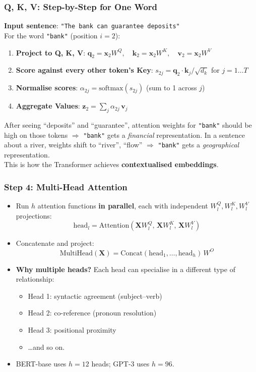 \begin{frame}[fragile]\frametitle{Q, K, V: Step-by-Step for One Word}
\textbf{Input sentence}: \texttt{"The bank can guarantee deposits"}\\[0.4em]
For the word \texttt{"bank"} (position $i = 2$):
\begin{enumerate}
\item \textbf{Project to Q, K, V}:
      $\mathbf{q}_2 = \mathbf{x}_2 W^Q,\quad
       \mathbf{k}_2 = \mathbf{x}_2 W^K,\quad
       \mathbf{v}_2 = \mathbf{x}_2 W^V$
\item \textbf{Score against every other token's Key}:
      $s_{2j} = \mathbf{q}_2 \cdot \mathbf{k}_j / \sqrt{d_k}$
      for $j = 1 \ldots T$
\item \textbf{Normalise scores}: $\alpha_{2j} = \text{softmax}(s_{2j})$
      \hfill {\small (sum to 1 across $j$)}
\item \textbf{Aggregate Values}:
      $\mathbf{z}_2 = \sum_j \alpha_{2j}\,\mathbf{v}_j$
\end{enumerate}
\vspace{0.3em}
After seeing ``deposits'' and ``guarantee'', attention weights for \texttt{"bank"} should
be high on those tokens $\Rightarrow$ \texttt{"bank"} gets a \emph{financial} representation.
In a sentence about a river, weights shift to ``river'', ``flow'' $\Rightarrow$
\texttt{"bank"} gets a \emph{geographical} representation.\\[0.3em]
This is how the Transformer achieves \textbf{contextualised embeddings}.
\end{frame}


\begin{frame}[fragile]\frametitle{Step 4: Multi-Head Attention}
\begin{itemize}
\item Run $h$ attention functions \textbf{in parallel}, each with independent $W^Q_l, W^K_l, W^V_l$ projections:
\[
  \text{head}_l = \text{Attention}(\mathbf{X}W^Q_l,\, \mathbf{X}W^K_l,\, \mathbf{X}W^V_l)
\]
\item Concatenate and project:
\[
  \text{MultiHead}(\mathbf{X}) = \text{Concat}(\text{head}_1, \ldots, \text{head}_h)\,W^O
\]
\item \textbf{Why multiple heads?} Each head can specialise in a different type of relationship:
  \begin{itemize}
  \item Head 1: syntactic agreement (subject–verb)
  \item Head 2: co-reference (pronoun resolution)
  \item Head 3: positional proximity
  \item \ldots and so on.
  \end{itemize}
\item BERT-base uses $h=12$ heads; GPT-3 uses $h=96$.
\end{itemize}
\end{frame}

